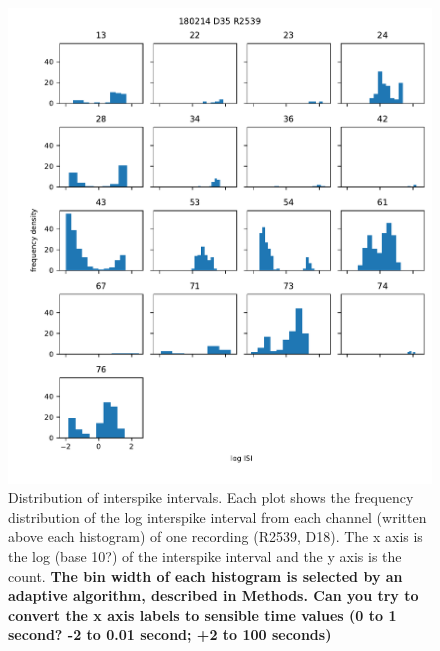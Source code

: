 \documentclass[doublespacing]{bmcart}
\begin{document}
\begin{backmatter}
\begin{figure}[h!]
  \includegraphics{../plots/logisi_plot44.pdf}
	\caption{Distribution of interspike intervals. Each plot shows the frequency distribution of the log interspike interval from each  channel (written above each histogram) of one recording (R2539, D18).  The x axis is the log (base 10?) of the interspike interval and the y axis is the count.  \textbf{The bin width of each histogram is selected by an adaptive algorithm, described in Methods.  Can you try to convert the x axis labels to sensible time values (0 to 1 second? -2 to 0.01 second; +2 to 100 seconds)}}
	\label{fig:logisi}
\end{figure}


\end{backmatter}
\end{document}

